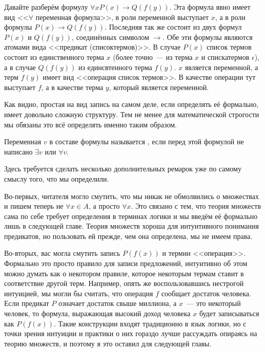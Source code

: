 \begin{example}
Давайте разберём формулу $\forall x P(x) \to Q(f(y))$. Эта формула явно имеет вид <<$\forall$ переменная формула>>, в роли переменной выступает $x$, а в роли формулы $P(x) \to Q(f(y))$. Последняя так же состоит из двух формул $P(x)$ и $Q(f(y))$, соединённых символом $\to$. Обе эти формулы являются атомами вида <<предикат (списоктермов)>>. В случае $P(x)$ список термов состоит из единственного терма $x$ (более точно~--- из терма $x$ и спискатермов $\epsilon$), а в случае $Q(f(y))$ из единсвтенного терма $f(y)$. $x$ является переменной, а терм $f(y)$ имеет вид <<операция список термов>>. В качестве операции тут выступает $f$, а в качестве терма $y$, который является переменной.
\end{example}

Как видно, простая на вид запись на самом деле, если определять её формально, имеет довольно сложную структуру. Тем не менее для математической строгости мы обязаны это всё определять именно таким образом.

\begin{definition}
Переменная $v$ в составе формулы называется , если перед этой формулой не написано $\exists v$ или $\forall v$.
\end{definition}

Здесь требуется сделать несколько дополнительных ремарок уже по самому смыслу того, что мы определили.

Во-первых, читателя могло смутить, что мы никак не обмолвились о множествах и пишем теперь не $\forall x\in A$, а просто $\forall x$. Это связано с тем, что теория множеств сама по себе требует определения в терминах логики и мы введём её формально лишь в следующей главе. Теория множеств хороша для интуитивного понимания предикатов, но пользовать ей прежде, чем она определена, мы не имеем права.

Во-вторых, вас могла смутить запись $P(f(x))$ и термин <<операция>>. Формально это просто правило для записи предложений, интуитивно об этом можно думать как о некотором правиле, которое некоторым термам ставит в соответствие другой терм. Например, опять же воспользовавшись нестрогой интуицией, мы могли бы считать, что операция $f$ сообщает достаток человека. Если предикат $P$ означает достаток свыше миллиона, а $x$~--- это некоторый человек, то формула, выражающая высокий доход человека $x$ будет записываться как $P(f(x))$. Такие конструкции входят традиционно в язык логики, но с точки зрения интуиции и практики о них гораздо лучше рассуждать опираясь на теорию множеств, и поэтому я это оставил для следующей главы.


